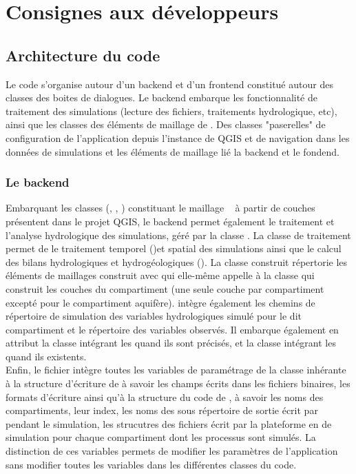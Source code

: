 \chapter{Consignes aux développeurs}

\section{Architecture du code}
Le code s'organise autour d'un backend et d'un frontend constitué autour des classes des boites de dialogues. Le backend embarque les fonctionnalité de traitement des simulations (lecture des fichiers, traitements hydrologique, etc), ainsi que les classes des éléments de maillage de \cws. Des classes "paserelles" de configuration de l'application depuis l'instance de QGIS et de navigation dans les données de simulations et les éléments de maillage lié la backend et le fondend. 

\subsection{Le backend} 
Embarquant les classes (, ,  ) constituant le maillage \cws~ à partir de couches  présentent dans le projet QGIS, le backend permet également le traitement et l'analyse hydrologique des simulations, géré par la classe . La classe de traitement  permet de le traitement temporel ()et  spatial  des simulations ainsi que le calcul des bilans hydrologiques et hydrogéologiques (). La classe  construit répertorie les éléments de maillages construit avec  qui elle-même appelle à la classe  qui construit les couches du compartiment (une seule couche par compartiment excepté pour le compartiment aquifère).  intègre également les chemins de répertoire de simulation des variables hydrologiques simulé pour le dit compartiment et le répertoire des variables observés. Il embarque également en attribut la classe  intégrant les  quand ils sont précisés, et la classe  intégrant les  quand ils existents.\\
Enfin, le fichier  intègre toutes les variables de paramétrage de la classe  inhérante à la structure d'écriture de \cws à savoir les champs écrits dans les fichiers binaires, les formats d'écriture ainsi qu'à la structure du code de \cws, à savoir les noms des compartiments, leur index, les noms des sous répertoire de sortie écrit par \cws pendant le simulation, les strucutres des fichiers  écrit par la plateforme \cws en de simulation pour chaque compartiment dont les processus sont simulés. La distinction de ces variables permets de modifier les paramètres de l'application sans modifier toutes les variables dans les différentes classes du code. 

